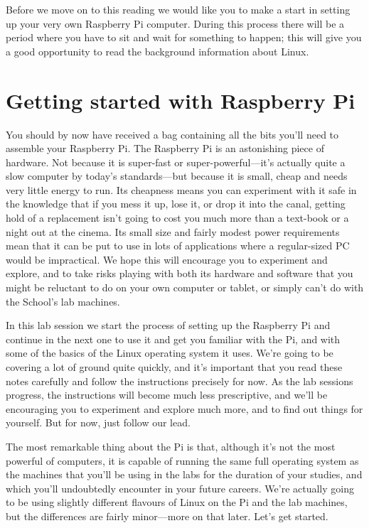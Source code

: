 Before we move on to this reading we would like you to make a start in setting up your very own Raspberry Pi computer. During this process there will be a period where you have to sit and wait for something to happen; this will give you a good opportunity to read the background information about Linux.

\section{Getting started with Raspberry Pi}

You should by now have received a bag containing all the bits you'll need to assemble your Raspberry Pi. The Raspberry Pi is an astonishing piece of hardware. Not because it is super-fast or super-powerful---it's actually quite a slow computer by today's standards---but because it is small, cheap and needs very little energy to run. Its cheapness means you can experiment with it safe in the knowledge that if you mess it up, lose it, or drop it into the canal, getting hold of a replacement isn't going to cost you much more than a text-book or a night out at the cinema. Its small size and fairly modest power requirements mean that it can be put to use in lots of applications where a regular-sized PC would be impractical.  We hope this will encourage you to experiment and explore, and to take risks playing with both its hardware and software that you might be reluctant to do on your own computer or tablet, or simply can't do with the School's lab machines.

In this lab session we start the process of setting up the  Raspberry Pi and continue in the next one to use it and get you familiar with the Pi, and with some of the basics of the Linux operating system it uses. We're going to be covering a lot of ground quite quickly, and it's important that you read these notes carefully and follow the instructions precisely for now. As the lab sessions progress, the instructions will become much less prescriptive, and we'll be encouraging you to experiment and explore much more, and to find out things for yourself. But for now, just follow our lead.

The most remarkable thing about the Pi is that, although it's not the most powerful of computers, it is capable of running the same full  operating system as the machines that you'll be using in the labs for the duration of your studies, and which you'll undoubtedly encounter in your future careers. We're actually going to be using slightly different flavours of Linux on the Pi and the lab machines, but the differences are fairly minor---more on that later. Let's get started.

